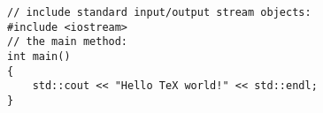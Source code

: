 \documentclass{article}
\begin{document}
\begin{lstlisting}
// include standard input/output stream objects:
#include <iostream>
// the main method:
int main()
{
    std::cout << "Hello TeX world!" << std::endl;
}
\end{lstlisting}
\end{document}
